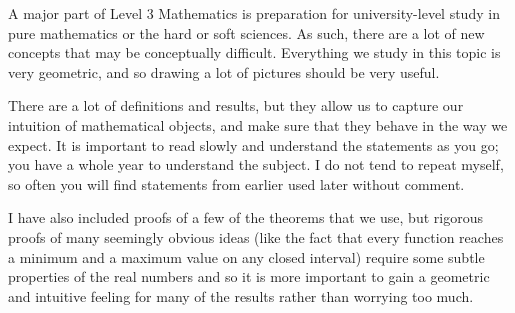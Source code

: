 A major part of Level 3 Mathematics is preparation for university-level study in pure mathematics or the hard or soft sciences. As such, there are
a lot of new concepts that may be conceptually difficult. Everything we study in this topic is very geometric, and so drawing a lot of pictures
should be very useful.

There are a lot of definitions and results, but they allow us to capture our intuition of mathematical objects, and make sure that they behave in
the way we expect. It is important to read slowly and understand the statements as you go; you have a whole year to understand the subject. I do
not tend to repeat myself, so often you will find statements from earlier used later without comment.

I have also included proofs of a few of the theorems that we use, but rigorous proofs of many seemingly obvious ideas (like the fact that every function
reaches a minimum and a maximum value on any closed interval) require some subtle properties of the real numbers and so it is more important to gain a
geometric and intuitive feeling for many of the results rather than worrying too much.



